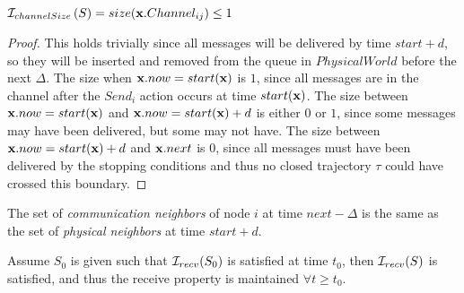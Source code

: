 \documentclass[10pt, conference, compsocconf]{IEEEtran}
\begin{document}
\begin{inv}

${\cal I}_{channelSize}\left(S\right) = size({\bf x}.Channel_{ij}) \leq 1$

\end{inv}

\begin{proof}
This holds trivially since all messages will be delivered by time $start + d$, so they will be inserted and removed from the queue in $PhysicalWorld$ before the next $\Delta$.  The size when ${\bf x}.now = start({\bf x})$ is $1$, since all messages are in the channel after the $Send_i$ action occurs at time $start({\bf x})$.  The size between ${\bf x}.now = start({\bf x})$ and ${\bf x}.now = start({\bf x}) + d$ is either $0$ or $1$, since some messages may have been delivered, but some may not have.  The size between ${\bf x}.now = start({\bf x}) + d$ and ${\bf x}.next$ is $0$, since all messages must have been delivered by the stopping conditions and thus no closed trajectory $\tau$ could have crossed this boundary.
\end{proof}

\begin{inv}
The set of \textit{communication neighbors} of node $i$ at time $next - \Delta$ is the same as the set of \textit{physical neighbors} at time $start + d$.

Assume $S_0$ is given such that ${\cal I}_{recv}(S_0)$ is satisfied at time $t_0$, then ${\cal I}_{recv}(S)$ is satisfied, and thus the receive property is maintained $\forall t \geq t_0$.
\end{inv}
\end{document}
